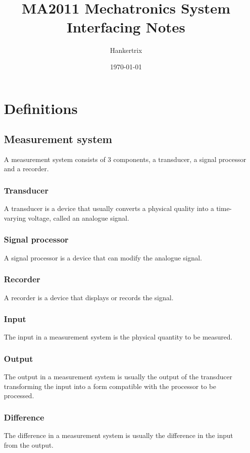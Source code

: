 \documentclass[11pt]{article}
\author{Hankertrix}
\date{\today}
\title{MA2011 Mechatronics System Interfacing Notes}
\begin{document}
\maketitle
\setcounter{tocdepth}{2}
\tableofcontents \clearpage\section{Definitions}
\label{sec:org32b3bd5}

\subsection{Measurement system}
\label{sec:org3daceac}
A measurement system consists of 3 components, a transducer, a signal processor and a recorder.
\subsubsection{Transducer}
\label{sec:orgbc3b1f4}
A transducer is a device that usually converts a physical quality into a time-varying voltage, called an analogue signal.
\subsubsection{Signal processor}
\label{sec:org7c4ae1c}
A signal processor is a device that can modify the analogue signal.
\subsubsection{Recorder}
\label{sec:orgd483d07}
A recorder is a device that displays or records the signal.
\subsubsection{Input}
\label{sec:orgaf5a8c1}
The input in a measurement system is the physical quantity to be measured.
\subsubsection{Output}
\label{sec:org2647de5}
The output in a measurement system is usually the output of the transducer transforming the input into a form compatible with the processor to be processed.
\subsubsection{Difference}
\label{sec:orgf666f76}
The difference in a measurement system is usually the difference in the input from the output.
\end{document}
